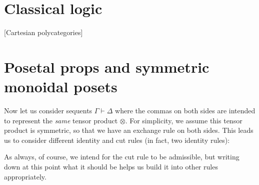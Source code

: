 \documentclass{book}
\let\types\vdash
\let\tensor\otimes
\begin{document}
\section{Classical logic}
\label{sec:classical}

[Cartesian polycategories]


\section{Posetal props and symmetric monoidal posets}
\label{sec:proppos-smpos}

Now let us consider sequents $\Gamma\types\Delta$ where the commas on both sides are intended to represent the \emph{same} tensor product $\tensor$.
For simplicity, we assume this tensor product is symmetric, so that we have an exchange rule on both sides.
This leads us to consider different identity and cut rules (in fact, two identity rules):
As always, of course, we intend for the cut rule to be admissible, but writing down at this point what it should be helps us build it into other rules appropriately.
\end{document}
